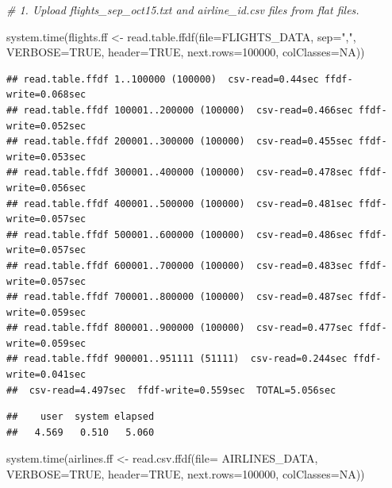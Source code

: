 \documentclass[
  12pt,
]{style/krantz}
\newenvironment{Shaded}{\begin{snugshade}}{\end{snugshade}}
\newcommand{\AttributeTok}[1]{\textcolor[rgb]{0.77,0.63,0.00}{#1}}
\newcommand{\CommentTok}[1]{\textcolor[rgb]{0.56,0.35,0.01}{\textit{#1}}}
\newcommand{\ConstantTok}[1]{\textcolor[rgb]{0.00,0.00,0.00}{#1}}
\newcommand{\DecValTok}[1]{\textcolor[rgb]{0.00,0.00,0.81}{#1}}
\newcommand{\FunctionTok}[1]{\textcolor[rgb]{0.00,0.00,0.00}{#1}}
\newcommand{\NormalTok}[1]{#1}
\newcommand{\OtherTok}[1]{\textcolor[rgb]{0.56,0.35,0.01}{#1}}
\newcommand{\StringTok}[1]{\textcolor[rgb]{0.31,0.60,0.02}{#1}}
\begin{document}
\begin{Shaded}
\begin{Highlighting}[]
\CommentTok{\# 1. Upload flights\_sep\_oct15.txt and airline\_id.csv files from flat files. }

\FunctionTok{system.time}\NormalTok{(flights.ff }\OtherTok{\textless{}{-}} \FunctionTok{read.table.ffdf}\NormalTok{(}\AttributeTok{file=}\NormalTok{FLIGHTS\_DATA,}
                                          \AttributeTok{sep=}\StringTok{","}\NormalTok{,}
                                          \AttributeTok{VERBOSE=}\ConstantTok{TRUE}\NormalTok{,}
                                          \AttributeTok{header=}\ConstantTok{TRUE}\NormalTok{,}
                                          \AttributeTok{next.rows=}\DecValTok{100000}\NormalTok{,}
                                          \AttributeTok{colClasses=}\ConstantTok{NA}\NormalTok{))}
\end{Highlighting}
\end{Shaded}

\begin{verbatim}
## read.table.ffdf 1..100000 (100000)  csv-read=0.44sec ffdf-write=0.068sec
## read.table.ffdf 100001..200000 (100000)  csv-read=0.466sec ffdf-write=0.052sec
## read.table.ffdf 200001..300000 (100000)  csv-read=0.455sec ffdf-write=0.053sec
## read.table.ffdf 300001..400000 (100000)  csv-read=0.478sec ffdf-write=0.056sec
## read.table.ffdf 400001..500000 (100000)  csv-read=0.481sec ffdf-write=0.057sec
## read.table.ffdf 500001..600000 (100000)  csv-read=0.486sec ffdf-write=0.057sec
## read.table.ffdf 600001..700000 (100000)  csv-read=0.483sec ffdf-write=0.057sec
## read.table.ffdf 700001..800000 (100000)  csv-read=0.487sec ffdf-write=0.059sec
## read.table.ffdf 800001..900000 (100000)  csv-read=0.477sec ffdf-write=0.059sec
## read.table.ffdf 900001..951111 (51111)  csv-read=0.244sec ffdf-write=0.041sec
##  csv-read=4.497sec  ffdf-write=0.559sec  TOTAL=5.056sec
\end{verbatim}

\begin{verbatim}
##    user  system elapsed 
##   4.569   0.510   5.060
\end{verbatim}

\begin{Shaded}
\begin{Highlighting}[]
\FunctionTok{system.time}\NormalTok{(airlines.ff }\OtherTok{\textless{}{-}} \FunctionTok{read.csv.ffdf}\NormalTok{(}\AttributeTok{file=}\NormalTok{ AIRLINES\_DATA,}
                             \AttributeTok{VERBOSE=}\ConstantTok{TRUE}\NormalTok{,}
                             \AttributeTok{header=}\ConstantTok{TRUE}\NormalTok{,}
                             \AttributeTok{next.rows=}\DecValTok{100000}\NormalTok{,}
                             \AttributeTok{colClasses=}\ConstantTok{NA}\NormalTok{))}
\end{Highlighting}
\end{Shaded}
\end{document}
